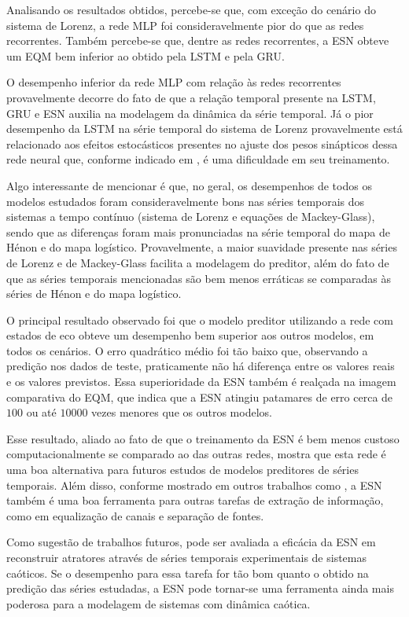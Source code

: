 \documentclass[a4paper, 12pt]{article}
\begin{document}
Analisando os resultados obtidos, percebe-se que, com exceção do cenário do sistema de Lorenz, a rede MLP foi consideravelmente pior do que as redes recorrentes. Também percebe-se que, dentre as redes recorrentes, a ESN obteve um EQM bem inferior ao obtido pela LSTM e pela GRU.

O desempenho inferior da rede MLP com relação às redes recorrentes provavelmente decorre do fato de que a relação temporal presente na LSTM, GRU e ESN auxilia na modelagem da dinâmica da série temporal. Já o pior desempenho da LSTM na série temporal do sistema de Lorenz provavelmente está relacionado aos efeitos estocásticos presentes no ajuste dos pesos sinápticos dessa rede neural que, conforme indicado em \cite{doya1992bifurcations}, é uma dificuldade em seu treinamento.

Algo interessante de mencionar é que, no geral, os desempenhos de todos os modelos estudados foram consideravelmente bons nas séries temporais dos sistemas a tempo contínuo (sistema de Lorenz e equações de Mackey-Glass), sendo que as diferenças foram mais pronunciadas na série temporal do mapa de Hénon e do mapa logístico. Provavelmente, a maior suavidade presente nas séries de Lorenz e de Mackey-Glass facilita a modelagem do preditor, além do fato de que as séries temporais mencionadas são bem menos erráticas se comparadas às séries de Hénon e do mapa logístico.

O principal resultado observado foi que o modelo preditor utilizando a rede com estados de eco obteve um desempenho bem superior aos outros modelos, em todos os cenários. O erro quadrático médio foi tão baixo que, observando a predição nos dados de teste, praticamente não há diferença entre os valores reais e os valores previstos. Essa superioridade da ESN também é realçada na imagem  comparativa do EQM, que indica que a ESN  atingiu patamares de erro cerca de $100$ ou até $10000$ vezes menores que os outros modelos. 

Esse resultado, aliado ao fato de que o treinamento da ESN é bem menos custoso computacionalmente se comparado ao das outras redes, mostra que esta rede é uma boa alternativa para futuros estudos de modelos preditores de séries temporais. Além disso, conforme mostrado em outros trabalhos como \cite{jaeger2004harnessing, jaeger2007echo, boccato2013novas}, a ESN também é uma boa ferramenta para outras tarefas de extração de informação, como em equalização de canais e separação de fontes. 

Como sugestão de trabalhos futuros, pode ser avaliada a eficácia da ESN em reconstruir atratores através de séries temporais experimentais de sistemas caóticos. Se o desempenho para essa tarefa for tão bom quanto o obtido na predição das séries estudadas, a ESN pode tornar-se uma ferramenta ainda mais poderosa para a modelagem de sistemas com dinâmica caótica.
\end{document}
